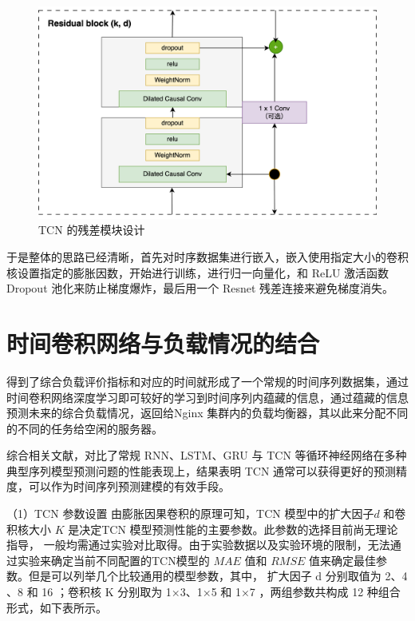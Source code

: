\begin{figure}[htbp]
  \centering
  \includegraphics[width=\textwidth]{figures/resiual_tcn.png}
  \caption{TCN 的残差模块设计}
  \label{residual_tcn}
\end{figure}

于是整体的思路已经清晰，首先对时序数据集进行嵌入，嵌入使用指定大小的卷积核设置指定的膨胀因数，开始进行训练，进行归一向量化，和 ReLU 激活函数 Dropout 池化来防止梯度爆炸，最后用一个 Resnet 残差连接来避免梯度消失。

\section{时间卷积网络与负载情况的结合}
得到了综合负载评价指标和对应的时间就形成了一个常规的时间序列数据集，通过时间卷积网络深度学习即可较好的学习到时间序列内蕴藏的信息，通过蕴藏的信息预测未来的综合负载情况，返回给Nginx 集群内的负载均衡器，其以此来分配不同的不同的任务给空闲的服务器。

综合相关文献，对比了常规 RNN、LSTM、GRU 与 TCN 等循环神经网络在多种典型序列模型预测问题的性能表现上，结果表明 TCN 通常可以获得更好的预测精度，可以作为时间序列预测建模的有效手段\cite{bai2018empirical}\cite{赵洋2022基于时间卷积网络的短期电力负荷预测}。

（1）TCN 参数设置
由膨胀因果卷积的原理可知，TCN 模型中的扩大因子$d$ 和卷积核大小 $K$ 是决定TCN 模型预测性能的主要参数。此参数的选择目前尚无理论指导， 一般均需通过实验对比取得\cite{hewage2020temporal}。由于实验数据以及实验环境的限制，无法通过实验来确定当前不同配置的TCN模型的 $MAE$ 值和 $RMSE$ 值来确定最佳参数。但是可以列举几个比较通用的模型参数，其中， 扩大因子 d 分别取值为 2、4 、8 和 16 ；卷积核 K 分别取为 1×3、1×5 和 1×7 ，两组参数共构成 12 种组合形式，如下表所示。


